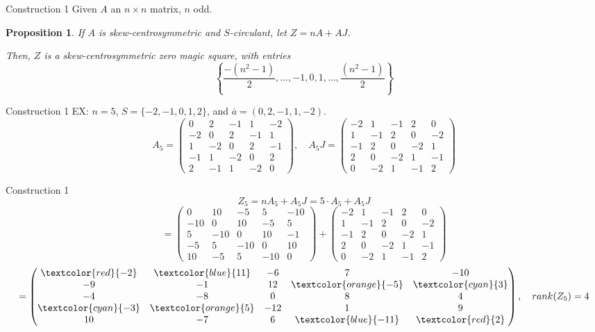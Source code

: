 \documentclass[10pt]{beamer}
\newtheorem{proposition}[theorem]{Proposition}
\begin{document}
\begin{frame}{Construction 1}
    Given $A$ an $n\times n$ matrix, $n$ odd.
    \begin{proposition}
        If $A$ is skew-centrosymmetric and $S$-circulant, let $Z=nA+AJ$.

        Then, $Z$ is a skew-centrosymmetric zero magic square, with entries
        $$\left\{\frac{-(n^2-1)}{2},...,-1,0,1,...,\frac{(n^2-1)}{2}\right\}$$
    \end{proposition}
\end{frame}
\begin{frame}{Construction 1}
    EX: $n=5$, $S=\{-2,-1,0,1,2\}$, and $\overline{a}=(0,2,-1,1,-2)$.
    \[A_{5}=\begin{pmatrix}
        0&2&-1&1&-2\\
        -2&0&2&-1&1\\
        1&-2&0&2&-1\\
        -1&1&-2&0&2\\
        2&-1&1&-2&0
    \end{pmatrix},\quad A_5J = \begin{pmatrix}
        -2&1&-1&2&0\\
        1&-1&2&0&-2\\
        -1&2&0&-2&1\\
        2&0&-2&1&-1\\
        0&-2&1&-1&2
    \end{pmatrix}\]
\end{frame}
\begin{frame}{Construction 1}
    \[Z_5 = nA_5+A_5J = 5\cdot A_5+A_5J\]
    \[=\begin{pmatrix}
        0&10&-5&5&-10\\
        -10&0&10&-5&5\\
        5&-10&0&10&-1\\
        -5&5&-10&0&10\\
        10&-5&5&-10&0
    \end{pmatrix} + \begin{pmatrix}
        -2&1&-1&2&0\\
        1&-1&2&0&-2\\
        -1&2&0&-2&1\\
        2&0&-2&1&-1\\
        0&-2&1&-1&2
    \end{pmatrix}\]
    \[=\begin{pmatrix}
        \textcolor{red}{-2}&\textcolor{blue}{11}&-6&7&-10\\
        -9&-1&12&\textcolor{orange}{-5}&\textcolor{cyan}{3}\\
        -4&-8&0&8&4\\
        \textcolor{cyan}{-3}&\textcolor{orange}{5}&-12&1&9\\
        10&-7&6&\textcolor{blue}{-11}&\textcolor{red}{2}
    \end{pmatrix},\quad rank(Z_5) = 4\]
\end{frame}
\end{document}
